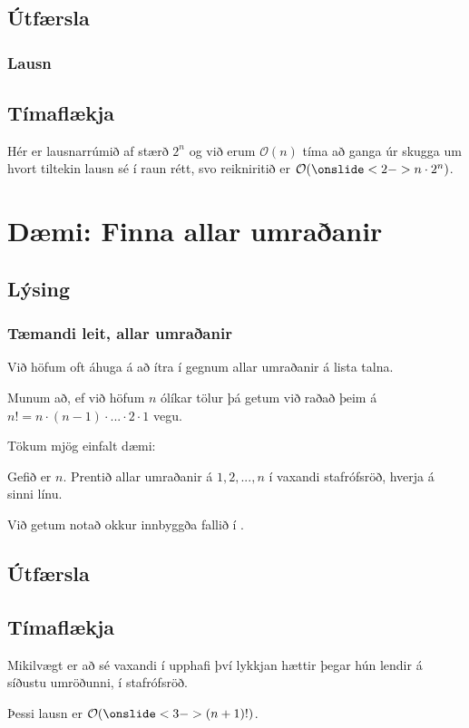 \subsection{Útfærsla}
{
    \frametitle{Lausn}
}

\subsection{Tímaflækja}
{
    {
        \item<1-> Hér er lausnarrúmið af stærð $2^n$ og við erum $\mathcal{O}(n)$ tíma að ganga úr skugga um hvort tiltekin lausn sé í raun rétt,
            svo reikniritið er $\mathcal{O}(\onslide<2->{n \cdot 2^n})$.
    }
}

\section{Dæmi: Finna allar umraðanir}
\subsection{Lýsing}
{
    \frametitle{Tæmandi leit, allar umraðanir}
    {
        \item<1-> Við höfum oft áhuga á að ítra í gegnum allar umraðanir á lista talna.
        \item<2-> Munum að, ef við höfum $n$ ólíkar tölur þá getum við raðað þeim á $n! = n \cdot (n - 1) \cdot ... \cdot 2 \cdot 1$ vegu.
        \item<3-> Tökum mjög einfalt dæmi:
        \item<4-> Gefið er $n$. Prentið allar umraðanir á $1, 2, ..., n$ í vaxandi stafrófsröð, hverja á sinni línu.
        \item<5-> Við getum notað okkur innbyggða fallið  í .
    }
}

\subsection{Útfærsla}
{
}

\subsection{Tímaflækja}
{
    {
        \item<1-> Mikilvægt er að  sé vaxandi í upphafi því lykkjan hættir þegar hún lendir á síðustu umröðunni, í stafrófsröð.
        \item<2-> Þessi lausn er $\mathcal{O}(\onslide<3->{(n + 1)!})$.
    }
}

